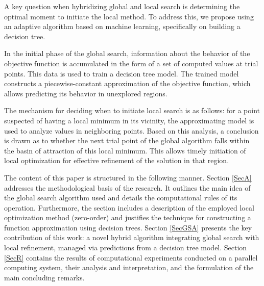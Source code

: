 \documentclass[runningheads]{llncs}
\begin{document}

A key question when hybridizing global and local search is determining the optimal moment to initiate the local method. To address this, we propose using an adaptive algorithm based on machine learning, specifically on building a decision tree.

In the initial phase of the global search, information about the behavior of the objective function is accumulated in the form of a set of computed values at trial points. This data is used to train a decision tree model. The trained model constructs a piecewise-constant approximation of the objective function, which allows predicting its behavior in unexplored regions.

The mechanism for deciding when to initiate local search is as follows: for a point suspected of having a local minimum in its vicinity, the approximating model is used to analyze values in neighboring points. Based on this analysis, a conclusion is drawn as to whether the next trial point of the global algorithm falls within the basin of attraction of this local minimum. This allows timely initiation of local optimization for effective refinement of the solution in that region.

The content of this paper is structured in the following manner. 
Section \ref{SecA} addresses the methodological basis of the research. It outlines the main idea of the global search algorithm used and details the computational rules of its operation. Furthermore, the section includes a description of the employed local optimization method (zero-order) and justifies the technique for constructing a function approximation using decision trees.
Section \ref{SecGSA} presents the key contribution of this work: a novel hybrid algorithm integrating global search with local refinement, managed via predictions from a decision tree model.
Section \ref{SecR} contains the results of computational experiments conducted on a parallel computing system, their analysis and interpretation, and the formulation of the main concluding remarks.
\end{document}
